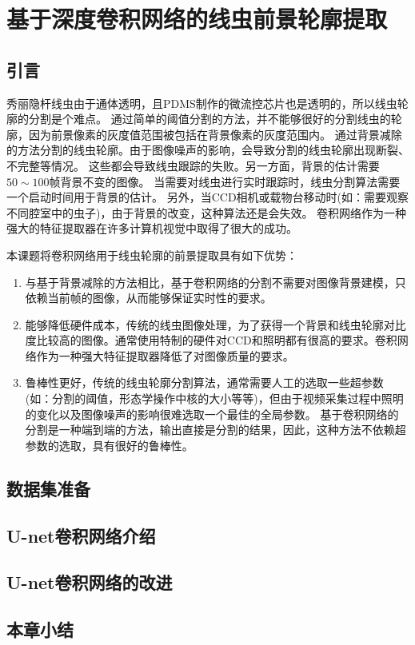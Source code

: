 \chapter{基于深度卷积网络的线虫前景轮廓提取}
\section{引言}
秀丽隐杆线虫由于通体透明，且PDMS制作的微流控芯片也是透明的，所以线虫轮廓的分割是个难点。
通过简单的阈值分割的方法，并不能够很好的分割线虫的轮廓，因为前景像素的灰度值范围被包括在背景像素的灰度范围内。
通过背景减除的方法分割的线虫轮廓。由于图像噪声的影响，会导致分割的线虫轮廓出现断裂、不完整等情况。
这些都会导致线虫跟踪的失败。另一方面，背景的估计需要$50\sim100$帧背景不变的图像。
当需要对线虫进行实时跟踪时，线虫分割算法需要一个启动时间用于背景的估计。
另外，当CCD相机或载物台移动时(如：需要观察不同腔室中的虫子)，由于背景的改变，这种算法还是会失效。
卷积网络作为一种强大的特征提取器在许多计算机视觉中取得了很大的成功。

	本课题将卷积网络用于线虫轮廓的前景提取具有如下优势：
	
\begin{enumerate}
  \item 与基于背景减除的方法相比，基于卷积网络的分割不需要对图像背景建模，只依赖当前帧的图像，从而能够保证实时性的要求。
  \item 能够降低硬件成本，传统的线虫图像处理，为了获得一个背景和线虫轮廓对比度比较高的图像。通常使用特制的硬件对CCD和照明都有很高的要求。卷积网络作为一种强大特征提取器降低了对图像质量的要求。
  \item 鲁棒性更好，传统的线虫轮廓分割算法，通常需要人工的选取一些超参数(如：分割的阈值，形态学操作中核的大小等等)，但由于视频采集过程中照明的变化以及图像噪声的影响很难选取一个最佳的全局参数。
基于卷积网络的分割是一种端到端的方法，输出直接是分割的结果，因此，这种方法不依赖超参数的选取，具有很好的鲁棒性。
\end{enumerate}

\section{数据集准备}
\section{U-net卷积网络介绍}

\section{U-net卷积网络的改进}

\section{本章小结}